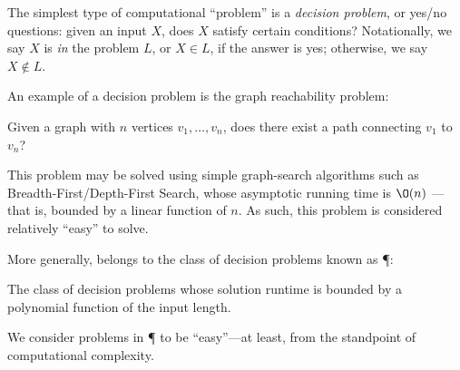 The simplest type of computational ``problem'' is a \emph{decision problem}, or
yes/no questions: given an input \(X\), does \(X\) satisfy certain conditions?
Notationally, we say \(X\) is \emph{in} the problem \(L\), or \(X\in L\), if
the answer is yes; otherwise, we say \(X\notin L\).

An example of a decision problem is the graph reachability problem:
\begin{definition}%
  Given a graph with \(n\) vertices \(v_1, \dots, v_n\), does there exist a
  path connecting \(v_1\) to \(v_n\)?
\end{definition}
This problem may be solved using simple graph-search algorithms such as
Breadth-First/Depth-First Search, whose asymptotic running time is \(\O(n)\)
---that is, bounded by a linear function of \(n\).  As such, this problem is
considered relatively ``easy'' to solve.

More generally,  belongs to the class of decision
problems known as \P:
\begin{definition}[\P]%
  The class of decision problems whose solution runtime is bounded by a
  polynomial function of the input length.
\end{definition}
We consider problems in \P{} to be ``easy''---at least, from the standpoint of
computational complexity.

